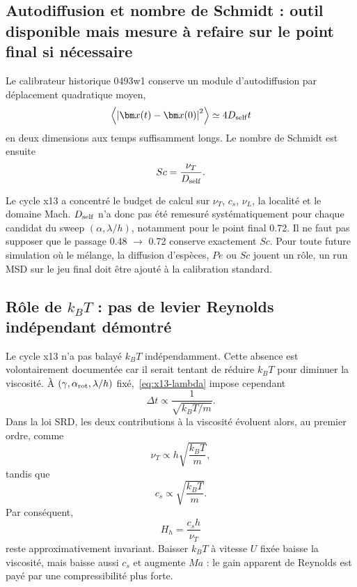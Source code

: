 \documentclass[11pt,a4paper]{article}
\begin{document}
\subsection{Autodiffusion et nombre de Schmidt : outil disponible mais mesure à refaire sur le point final si nécessaire}

Le calibrateur historique 0493w1 conserve un module d'autodiffusion par déplacement quadratique moyen,
\begin{equation}
  \left\langle
  \left|
  \bm x(t)-\bm x(0)
  \right|^2
  \right\rangle
  \simeq
  4D_{\rm self}t
\end{equation}
en deux dimensions aux temps suffisamment longs. Le nombre de Schmidt est ensuite
\begin{equation}
  Sc=\frac{\nu_T}{D_{\rm self}}.
\end{equation}

Le cycle x13 a concentré le budget de calcul sur $\nu_T$, $c_s$, $\nu_L$, la localité et le domaine Mach. $D_{\rm self}$ n'a donc pas été remesuré systématiquement pour chaque candidat du sweep $(\alpha,\lambda/h)$, notamment pour le point final 0.72. Il ne faut pas supposer que le passage 0.48 $\rightarrow$ 0.72 conserve exactement $Sc$. Pour toute future simulation où le mélange, la diffusion d'espèces, $Pe$ ou $Sc$ jouent un rôle, un run MSD sur le jeu final doit être ajouté à la calibration standard.

\subsection{Rôle de \texorpdfstring{$k_BT$}{kBT} : pas de levier Reynolds indépendant démontré}

Le cycle x13 n'a pas balayé $k_BT$ indépendamment. Cette absence est volontairement documentée car il serait tentant de réduire $k_BT$ pour diminuer la viscosité. À $(\gamma,\alpha_{\rm rot},\lambda/h)$ fixé,~\eqref{eq:x13-lambda} impose cependant
\begin{equation}
  \Delta t
  \propto
  \frac{1}{\sqrt{k_BT/m}}.
\end{equation}
Dans la loi SRD, les deux contributions à la viscosité évoluent alors, au premier ordre, comme
\begin{equation}
  \nu_T\propto h\sqrt{\frac{k_BT}{m}},
\end{equation}
tandis que
\begin{equation}
  c_s\propto\sqrt{\frac{k_BT}{m}}.
\end{equation}
Par conséquent,
\begin{equation}
  H_h=\frac{c_sh}{\nu_T}
\end{equation}
reste approximativement invariant. Baisser $k_BT$ à vitesse $U$ fixée baisse la viscosité, mais baisse aussi $c_s$ et augmente $Ma$ : le gain apparent de Reynolds est payé par une compressibilité plus forte.
\end{document}
